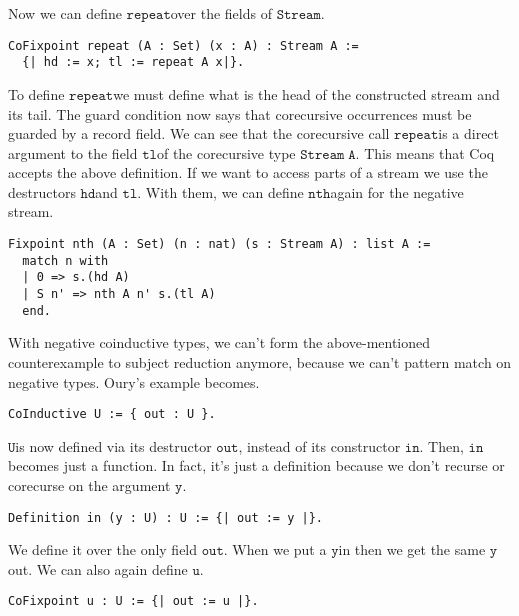 \documentclass[a4paper,cleardoubleempty,BCOR1cm]{scrbook}
\begin{document}
Now we can define $\mathtt{repeat}$\;over the fields of $\mathtt{Stream}$.

\begin{verbatim}
CoFixpoint repeat (A : Set) (x : A) : Stream A :=
  {| hd := x; tl := repeat A x|}.
\end{verbatim}

To define $\mathtt{repeat}$\;we must define what is the head of the constructed stream
and its tail.  The guard condition now says that corecursive
occurrences must be guarded by a record field.  We can see that the
corecursive call $\mathtt{repeat}$\;is a direct argument to the field $\mathtt{tl}$\;of the
corecursive type $\mathtt{Stream\;A}$.  This means that Coq accepts the above definition.
If we want to access parts of a stream we use the destructors $\mathtt{hd}$\;and
$\mathtt{tl}$.  With them, we can define $\mathtt{nth}$\;again for the negative stream.

\begin{verbatim}
Fixpoint nth (A : Set) (n : nat) (s : Stream A) : list A :=
  match n with
  | 0 => s.(hd A)
  | S n' => nth A n' s.(tl A)
  end.
\end{verbatim}

With negative coinductive types, we can't form the above-mentioned
counterexample to subject reduction anymore, because we can't pattern match
on negative types. Oury's example becomes.

\begin{verbatim}
CoInductive U := { out : U }.
\end{verbatim}

$\mathtt{U}$\;is now defined via its destructor $\mathtt{out}$, instead of its constructor
 $\mathtt{in}$. Then, $\mathtt{in}$\;\linebreak becomes just a function. In fact, it's just a
 definition because we don't recurse or corecurse on the argument $\mathtt{y}$.

\begin{verbatim}
Definition in (y : U) : U := {| out := y |}.
\end{verbatim}

We define it over the only field $\mathtt{out}$.  When we put a $\mathtt{y}$\;in then we get
the same $\mathtt{y}$\;out.  We can also again define $\mathtt{u}$.

\begin{verbatim}
CoFixpoint u : U := {| out := u |}.
\end{verbatim}
\end{document}
